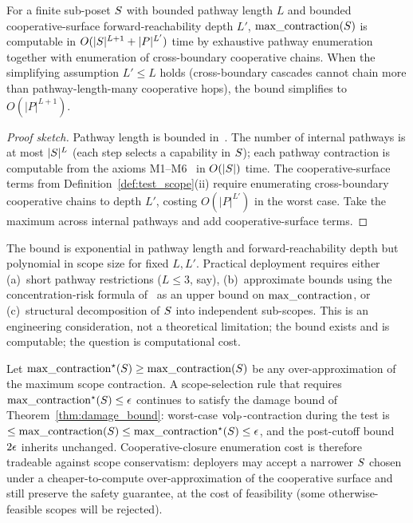 \begin{lemma}
\label{lem:computable_maxcon}
For a finite sub-poset $S$ with bounded pathway length $L$
and bounded cooperative-surface forward-reachability depth
$L'$, $\mathrm{max\_contraction}(S)$ is computable in
$O(|S|^{L+1} + |P|^{L'})$ time by exhaustive pathway
enumeration together with enumeration of cross-boundary
cooperative chains.  When the simplifying assumption $L' \leq L$
holds (cross-boundary cascades cannot chain more than
pathway-length-many cooperative hops), the bound simplifies to
$O(|P|^{L+1})$.
\end{lemma}

\begin{proof}[Proof sketch]
Pathway length is bounded
in~\citep[Definition~2]{lasser2026horizon}.  The number of
internal pathways is at most $|S|^L$ (each step selects a
capability in $S$); each pathway contraction is computable
from the axioms M1--M6~\citep[Proposition~1]{lasser2026poset} in
$O(|S|)$ time.  The cooperative-surface terms from
Definition~\ref{def:test_scope}(ii) require enumerating
cross-boundary cooperative chains to depth $L'$, costing
$O(|P|^{L'})$ in the worst case.  Take the maximum across
internal pathways and add cooperative-surface terms.
\end{proof}

\begin{remark}
\label{rem:computability}
The bound is exponential in pathway length and
forward-reachability depth but polynomial in scope size for
fixed $L, L'$.  Practical deployment
requires either (a)~short pathway restrictions ($L \leq 3$,
say), (b)~approximate bounds using the concentration-risk
formula
of~\citep[Definition~3]{lasser2026horizon} as an upper bound on
$\mathrm{max\_contraction}$, or (c)~structural decomposition of $S$ into
independent sub-scopes.  This is an engineering consideration,
not a theoretical limitation; the bound exists and is
computable; the question is computational cost.
\end{remark}

\begin{corollary}
\label{cor:over_approx_safety}
Let $\mathrm{max\_contraction}^\star(S) \geq \mathrm{max\_contraction}(S)$ be any
over-approximation of the maximum scope contraction.  A
scope-selection rule that requires $\mathrm{max\_contraction}^\star(S) \leq
\epsilon$ continues to satisfy the damage bound of
Theorem~\ref{thm:damage_bound}: worst-case ${\operatorname{vol}_{\mathrm{P}}}$-contraction
during the test is $\leq \mathrm{max\_contraction}(S) \leq
\mathrm{max\_contraction}^\star(S) \leq \epsilon$, and the post-cutoff
bound $2\epsilon$ inherits unchanged.  Cooperative-closure
enumeration cost is therefore tradeable against scope
conservatism: deployers may accept a narrower $S$ chosen
under a cheaper-to-compute over-approximation of the
cooperative surface and still preserve the safety guarantee,
at the cost of feasibility (some otherwise-feasible scopes will
be rejected).
\end{corollary}

